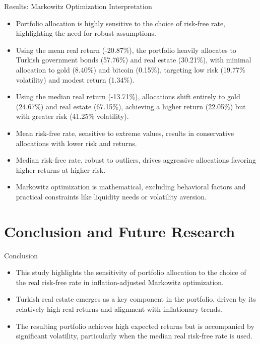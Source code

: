 \documentclass{beamer}
\begin{document}
\begin{frame}{Results: Markowitz Optimization Interpretation}
\begin{itemize}
\item Portfolio allocation is highly sensitive to the choice of risk-free rate, highlighting the need for robust assumptions.
\item Using the mean real return (-20.87\%), the portfolio heavily allocates to Turkish government bonds (57.76\%) and real estate (30.21\%), with minimal allocation to gold (8.40\%) and bitcoin (0.15\%), targeting low risk (19.77\% volatility) and modest return (1.34\%).
\item Using the median real return (-13.71\%), allocations shift entirely to gold (24.67\%) and real estate (67.15\%), achieving a higher return (22.05\%) but with greater risk (41.25\% volatility).
\item Mean risk-free rate, sensitive to extreme values, results in conservative allocations with lower risk and returns.
\item Median risk-free rate, robust to outliers, drives aggressive allocations favoring higher returns at higher risk.
\item Markowitz optimization is mathematical, excluding behavioral factors and practical constraints like liquidity needs or volatility aversion.
\end{itemize}
\end{frame}

\section{Conclusion and Future Research}
\begin{frame}{Conclusion}
\begin{itemize}
\item This study highlights the sensitivity of portfolio allocation to the choice of the real risk-free rate in inflation-adjusted Markowitz optimization.
\item Turkish real estate emerges as a key component in the portfolio, driven by its relatively high real returns and alignment with inflationary trends.
\item The resulting portfolio achieves high expected returns but is accompanied by significant volatility, particularly when the median real risk-free rate is used.
\end{itemize}
\end{frame}
\end{document}
